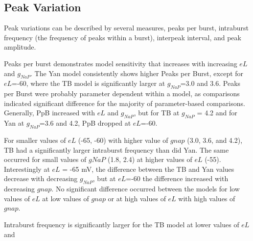 \documentclass[11pt]{article}
\begin{document}
%
%


\subsection{Peak Variation}
Peak variations can be described by several measures, peaks per burst, intraburst frequency (the frequency of peaks within a burst), interpeak interval, and peak amplitude.

Peaks per burst demonstrates model sensitivity that increases with increasing $eL$ and $g_{NaP}$. The Yan model consistently shows higher Peaks per Burst, except for $eL$=-60, where the TB model is significantly larger at $g_{NaP}$=3.0 and 3.6. Peaks per Burst were probably parameter dependent within a model, as comparisons indicated significant difference for the majority of parameter-based comparisons. Generally,  PpB increased with $eL$ and $g_{NaP}$, but for TB at $g_{NaP}$ = 4.2  and for Yan at $g_{NaP}$=3.6 and 4.2, PpB dropped at $eL$=-60.


For smaller values of $eL$ (-65, -60) with higher value of $gnap$ (3.0, 3.6, and 4.2), TB had a significantly larger intraburst frequency than did Yan. The same occurred for small values of $gNaP$ (1.8, 2.4) at higher values of $eL$ (-55). Interestingly at $eL$ = -65 mV, the difference between the TB and Yan values decrease with decreasing $g_{NaP}$, but at $eL$=-60 the difference increased with decreasing $gnap$. No significant difference occurred between the models for low values of $eL$ at low values of $gnap$ or at high values of $eL$ with high values of $gnap$.


Intraburst frequency is significantly larger for the TB model at lower values of $eL$ and 
\end{document}
